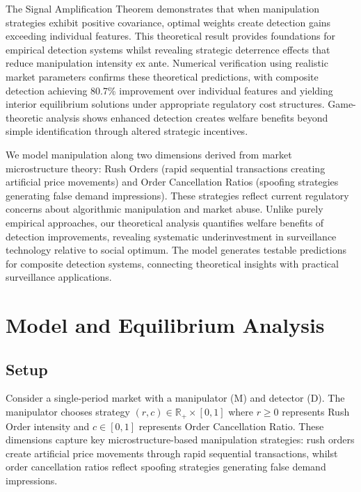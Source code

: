 \documentclass[12pt]{article}
\begin{document}
The Signal Amplification Theorem demonstrates that when manipulation strategies exhibit positive covariance, optimal weights create detection gains exceeding individual features. This theoretical result provides foundations for empirical detection systems whilst revealing strategic deterrence effects that reduce manipulation intensity ex ante. Numerical verification using realistic market parameters confirms these theoretical predictions, with composite detection achieving 80.7\% improvement over individual features and yielding interior equilibrium solutions under appropriate regulatory cost structures. Game-theoretic analysis shows enhanced detection creates welfare benefits beyond simple identification through altered strategic incentives.

We model manipulation along two dimensions derived from market microstructure theory: Rush Orders (rapid sequential transactions creating artificial price movements) and Order Cancellation Ratios (spoofing strategies generating false demand impressions). These strategies reflect current regulatory concerns about algorithmic manipulation and market abuse. Unlike purely empirical approaches, our theoretical analysis quantifies welfare benefits of detection improvements, revealing systematic underinvestment in surveillance technology relative to social optimum. The model generates testable predictions for composite detection systems, connecting theoretical insights with practical surveillance applications.

\section{Model and Equilibrium Analysis}

\subsection{Setup}

Consider a single-period market with a manipulator (M) and detector (D). The manipulator chooses strategy $(r,c) \in \mathbb{R}_+ \times [0,1]$ where $r \geq 0$ represents Rush Order intensity and $c \in [0,1]$ represents Order Cancellation Ratio. These dimensions capture key microstructure-based manipulation strategies: rush orders create artificial price movements through rapid sequential transactions, whilst order cancellation ratios reflect spoofing strategies generating false demand impressions.
\end{document}
